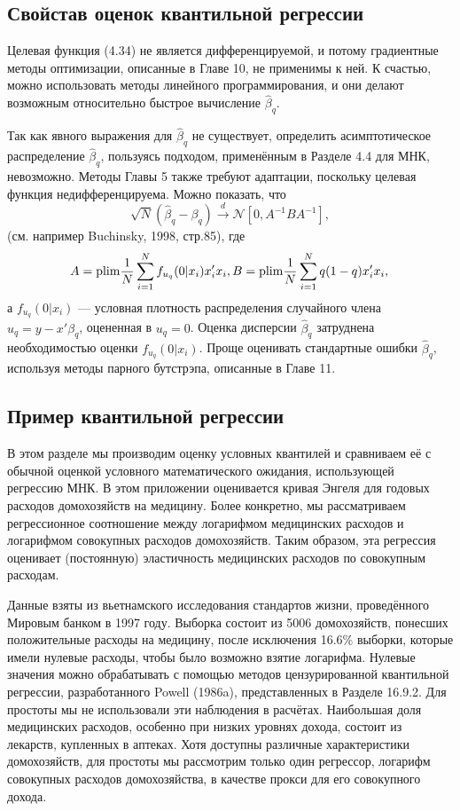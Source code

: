 \subsection{Свойстав оценок квантильной регрессии}

Целевая функция (4.34) не является дифференцируемой, и потому градиентные методы оптимизации, описанные в Главе 10, не применимы к ней. К счастью, можно использовать методы линейного программирования, и они делают возможным относительно быстрое вычисление $\hat{\beta}_q$.

Так как явного выражения для $\hat{\beta}_q$ не существует, определить асимптотическое распределение $\hat{\beta}_q$, пользуясь подходом, применённым в Разделе 4.4 для МНК, невозможно. Методы Главы 5 также требуют адаптации, поскольку целевая функция недифференцируема. Можно показать, что 
\begin{equation}
\sqrt{N}(\hat{\beta}_q-\beta_q)  \xrightarrow{d} \mathcal{N} [0, A^{-1}BA^{-1}],
\end{equation}
(см. например Buchinsky, 1998, стр.85), где 
\begin{equation}
A = \mathrm{plim } \frac{1}{N} \sum_{i=1}^{N} f_{u_{q}}(0|x_i)x_i'x_i, \\
B = \mathrm{plim } \frac{1}{N} \sum_{i=1}^{N}q(1-q)x_i'x_i, \\
\end{equation}
а $f_{u_{q}}(0|x_i)$ --- условная плотность распределения случайного члена $u_q = y -x'\beta_q$, оцененная в $u_q = 0$. Оценка дисперсии $\hat{\beta}_q$ затруднена необходимостью оценки  $f_{u_{q}}(0|x_i)$. Проще оценивать стандартные ошибки $\hat{\beta}_q$, используя методы парного бутстрэпа, описанные в Главе 11.

\subsection{Пример квантильной регрессии}

В этом разделе мы производим оценку условных квантилей и сравниваем её с обычной оценкой условного математического ожидания, использующей регрессию МНК. В этом приложении оценивается кривая Энгеля для годовых расходов домохозяйств на медицину. Более конкретно, мы рассматриваем регрессионное соотношение между логарифмом медицинских расходов и логарифмом совокупных расходов домохозяйств. Таким образом, эта регрессия оценивает (постоянную) эластичность медицинских расходов по совокупным расходам.

Данные взяты из вьетнамского исследования стандартов жизни, проведённого Мировым банком в 1997 году. Выборка состоит из 5006 домохозяйств, понесших положительные расходы на медицину, после исключения 16.6\% выборки, которые имели нулевые расходы, чтобы было возможно взятие логарифма. Нулевые значения можно обрабатывать с помощью методов цензурированной квантильной регрессии, разработанного Powell (1986a), представленных в Разделе 16.9.2. Для простоты мы не использовали эти наблюдения в расчётах. Наибольшая доля медицинских расходов, особенно при низких уровнях дохода, состоит из лекарств, купленных в аптеках. Хотя доступны различные характеристики домохозяйств, для простоты мы рассмотрим только один регрессор, логарифм совокупных расходов домохозяйства, в качестве прокси для его совокупного дохода. 


